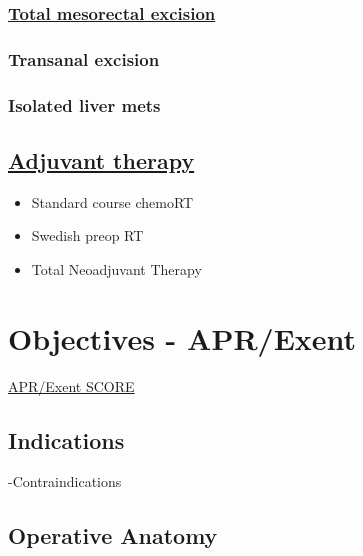 \documentclass[
]{book}
\providecommand{\tightlist}{%
  \setlength{\itemsep}{0pt}\setlength{\parskip}{0pt}}
\begin{document}
\hypertarget{total-mesorectal-excision}{%
\subsection{\texorpdfstring{\href{767-rectal_surgery.html}{Total mesorectal excision}}{Total mesorectal excision}}\label{total-mesorectal-excision}}

\hypertarget{transanal-excision}{%
\subsection{Transanal excision}\label{transanal-excision}}

\hypertarget{isolated-liver-mets}{%
\subsection{Isolated liver mets}\label{isolated-liver-mets}}

\hypertarget{adjuvant-therapy}{%
\section{\texorpdfstring{\href{770-rectal_RT.html}{Adjuvant therapy}}{Adjuvant therapy}}\label{adjuvant-therapy}}

\begin{itemize}
\tightlist
\item
  Standard course chemoRT
\item
  Swedish preop RT
\item
  Total Neoadjuvant Therapy
\end{itemize}

\hypertarget{objectives---aprexent}{%
\chapter{Objectives - APR/Exent}\label{objectives---aprexent}}

\href{https://www.surgicalcore.org/modulecontent.aspx?id=162148}{APR/Exent SCORE}

\hypertarget{indications-1}{%
\section{Indications}\label{indications-1}}

-Contraindications

\hypertarget{operative-anatomy}{%
\section{Operative Anatomy}\label{operative-anatomy}}
\end{document}
